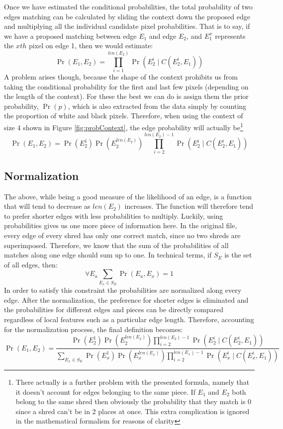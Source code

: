 Once we have estimated the conditional probabilities, the total probability of two edges matching can be calculated by sliding the context down the proposed edge and multiplying all the individual candidate pixel probabilities. That is to say, if we have a proposed matching between edge \(E_1\) and edge \(E_2\), and \(E_1^x\) represents the $xth$ pixel on edge 1, then we would estimate: \[\Pr(E_1,E_2) = \prod_{i=1}^{len(E_2)} \Pr(E_2^i \mid C(E_2^i,E_1))\] A problem arises though, because the shape of the context prohibits us from taking the conditional probability for the first and last few pixels (depending on the length of the context). For these the best we can do is assign them the prior probability, \(\Pr(p)\), which is also extracted from the data simply by counting the proportion of white and black pixels. Therefore, when using the context of size 4 shown in Figure \ref{fig:probContext}, the edge probability will actually be\footnote{There actually is a further problem with the presented formula, namely that it doesn't account for edges belonging to the same piece. If \(E_1\) and \(E_2\) both belong to the same shred then obviously the probability that they match is 0 since a shred can't be in 2 places at once. This extra complication is ignored in the mathematical formalism for reasons of clarity}  \[\Pr(E_1,E_2) = \Pr(E_2^1) \Pr(E_2^{len(E_2)}) \prod_{i=2}^{len(E_2)-1} \Pr(E_2^i \mid C(E_2^i,E_1)) \]

\subsection{Normalization}\label{sect:norm}
The above, while being a good measure of the likelihood of an edge, is a function that will tend to decrease as $len(E_2)$ increases. The function will therefore tend to prefer shorter edges with less probabilities to multiply. Luckily, using probabilities gives us one more piece of information here. In the original file, every edge of every shred has only one correct match, since no two shreds are superimposed. Therefore, we know that the sum of the probabilities of all matches along one edge should sum up to one. In technical terms, if \(S_E\) is the set of all edges, then: \[\forall E_a \sum_{E_x \in S_E} \Pr(E_a,E_x) = 1 \] In order to satisfy this constraint the probabilities are normalized along every edge. After the normalization, the preference for shorter edges is eliminated and the probabilities for different edges and pieces can be directly compared regardless of local features such as a particular edge length. Therefore, accounting for the normalization process, the final definition becomes:  \[ \Pr(E_1,E_2) = \frac{\Pr(E_2^1) \Pr(E_2^{len(E_2)}) \prod_{i=2}^{len(E_2)-1} \Pr(E_2^i \mid C(E_2^i,E_1))}{\sum_{E_x \in S_E} \Pr(E_x^1) \Pr(E_x^{len(E_x)}) \prod_{i=2}^{len(E_x)-1} \Pr(E_x^i \mid C(E_x^i,E_1)) } \]


